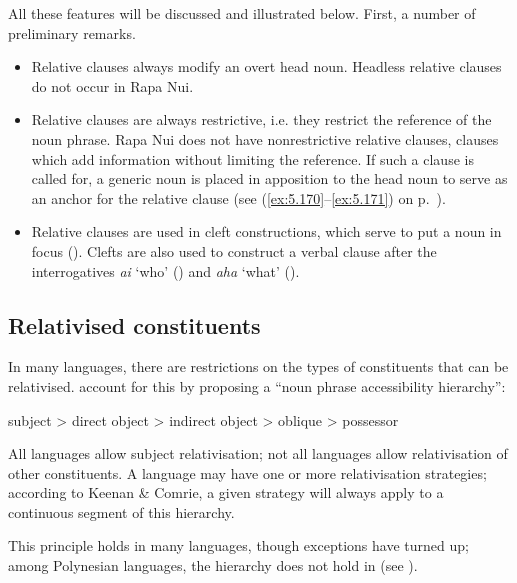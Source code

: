 All these features will be discussed and illustrated below. First, a number of preliminary remarks.

\begin{itemize}
\item 
Relative clauses always modify an overt head noun. Headless relative clauses do not occur in Rapa Nui.

\item 
Relative clauses are always restrictive, i.e. they restrict the reference of the noun phrase. Rapa Nui does not have nonrestrictive relative clauses, clauses which add information without limiting the reference. If such a clause is called for, a generic noun is placed in apposition to the head noun to serve as an anchor for the relative clause (see (\ref{ex:5.170}–\ref{ex:5.171}) on p.~\pageref{ex:5.170}).

\item 
Relative clauses are used in cleft constructions, which serve to put a noun in focus (). Clefts are also used to construct a verbal clause after the interrogatives \textit{ai} ‘who’ () and \textit{aha} ‘what’ ().

\end{itemize}
\subsection{Relativised constituents}\label{sec:11.4.2}

In many languages, there are restrictions on the types of constituents that can be relativised. \citet{KeenanComrie1977,KeenanComrie1979} account for this by proposing a “noun phrase accessibility hierarchy”: 

\ea\label{ex:11.88a}
\label{hierarchy}  subject {\textgreater} direct object {\textgreater} indirect object {\textgreater} oblique {\textgreater} possessor
\z

All languages allow subject relativisation; not all languages allow relativisation of other constituents. A language may have one or more relativisation strategies; according to Keenan \& Comrie, a given strategy will always apply to a continuous segment of this hierarchy. 

This principle holds in many languages, though exceptions have turned up; among Polynesian languages, the hierarchy does not hold in  (see \citealt{Harlow2007Maori}).

